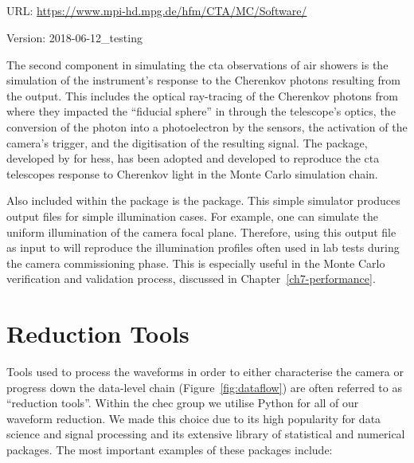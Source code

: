 \subsection{}
\vspace{-0.7em}
\noindent \hspace{\parindent} {\tiny URL: \url{https://www.mpi-hd.mpg.de/hfm/CTA/MC/Software/} \par}
\noindent \hspace{\parindent} {\tiny Version: 2018-06-12\_testing \par}

\noindent The second component in simulating the \gls{cta} observations of air showers is the simulation of the instrument's response to the Cherenkov photons resulting from the  output. This includes the optical ray-tracing of the Cherenkov photons from where they impacted the ``fiducial sphere'' in  through the telescope's optics, the conversion of the photon into a photoelectron by the sensors, the activation of the camera's trigger, and the digitisation of the resulting signal. The  package, developed by \textcite{Bernlohr2008} for \gls{hess}, has been adopted and developed to reproduce the \gls{cta} telescopes response to Cherenkov light in the Monte Carlo simulation chain.

Also included within the  package is the  package. This simple simulator produces  output files for simple illumination cases. For example, one can simulate the uniform illumination of the camera focal plane. Therefore, using this  output file as input to  will reproduce the illumination profiles often used in lab tests during the camera commissioning phase. This is especially useful in the Monte Carlo verification and validation process, discussed in Chapter~\ref{ch7-performance}.

\section{Reduction Tools}
\lstset{language=C++}

Tools used to process the waveforms in order to either characterise the camera or progress down the data-level chain (Figure~\ref{fig:dataflow}) are often referred to as ``reduction tools''. Within the \gls{chec} group we utilise Python for all of our waveform reduction. We made this choice due to its high popularity for data science and signal processing and its extensive library of statistical and numerical packages. The most important examples of these packages include:


